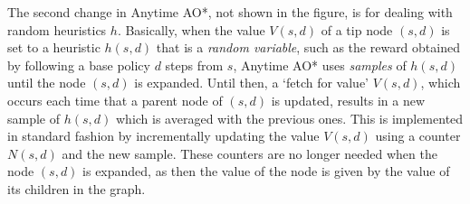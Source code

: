 \documentclass[letterpaper]{article}
\newcommand{\Omit}[1]{}
\begin{document}
The second change in Anytime AO*, not shown in the figure, is for
dealing with random heuristics $h$.  Basically, when the value $V(s,d)$ of a tip
node $(s,d)$ is set to a heuristic $h(s,d)$ that is a \emph{random variable}, 
such as the reward obtained by following a base policy $d$ steps from $s$, 
Anytime AO* uses \emph{samples} of $h(s,d)$ until the node $(s,d)$ 
is expanded. Until then, a `fetch for value'  $V(s,d)$, which occurs each time that a parent node of $(s,d)$ is 
updated, results in a new sample of $h(s,d)$ which is averaged with the previous ones.
This is implemented in standard fashion by incrementally 
updating the value $V(s,d)$ using a counter $N(s,d)$ and the new sample.
These counters are no longer needed when the node $(s,d)$ is expanded, as then
the value of the node is given by the value of its children in the graph.


\Omit{The result is an algorithm that is a tiny variation of AO*, but which at
the same time fits with the general idea underlying Monte Carlo Tree Search
methods of using approximate sampled values to guide an anytime optimal
search for solutions.}

\Omit{
The optimality of Anytime AO* does not depend on the heuristic values of 
tip nodes, which could even change randomly from one iteration to the next.
Like in AO*, however, the better the heuristic values, the better the quality
of Anytime AO*  after a short time window in general. Unlike AO*, however,
better heuristic values do not lead to a smaller explicit graph and
faster termination, as Anytime AO* guarantees optimality only after
the whole implicit graph has been explicated. Since this is also true
of AO* in the worst case, the worst case complexity of both algorithms
is the same.}
\end{document}
